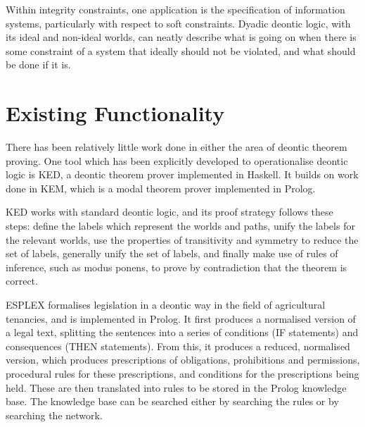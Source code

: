 \documentclass{l4proj}
\begin{document}
Within integrity constraints, one application is the specification of information systems\cite{infosystems}, particularly with respect to soft constraints. Dyadic deontic logic, with its ideal and non-ideal worlds, can neatly describe what is going on when there is some constraint of a system that ideally should not be violated, and what should be done if it is. %

\section{Existing Functionality}
There has been relatively little work done in either the area of deontic theorem proving. One tool which has been explicitly developed to operationalise deontic logic is KED\cite{KED}, a deontic theorem prover implemented in Haskell. It builds on work done in KEM\cite{KEM}, which is a modal theorem prover implemented in Prolog. 


KED works with standard deontic logic, and its proof strategy follows these steps: define the labels which represent the worlds and paths, unify the labels for the relevant worlds, use the properties of transitivity and symmetry to reduce the set of labels, generally unify the set of labels, and finally make use of rules of inference, such as modus ponens, to prove by contradiction that the theorem is correct. 


ESPLEX formalises legislation in a deontic way in the field of agricultural tenancies\cite{ESPLEX}, and is implemented in Prolog. It first produces a normalised version of a legal text, splitting the sentences into a series of conditions (IF statements) and consequences (THEN statements). From this, it produces a reduced, normalised version, which produces prescriptions of obligations, prohibitions and permissions, procedural rules for these prescriptions, and conditions for the prescriptions being held. These are then translated into rules to be stored in the Prolog knowledge base. The knowledge base can be searched either by searching the rules or by searching the network. 
\end{document}
